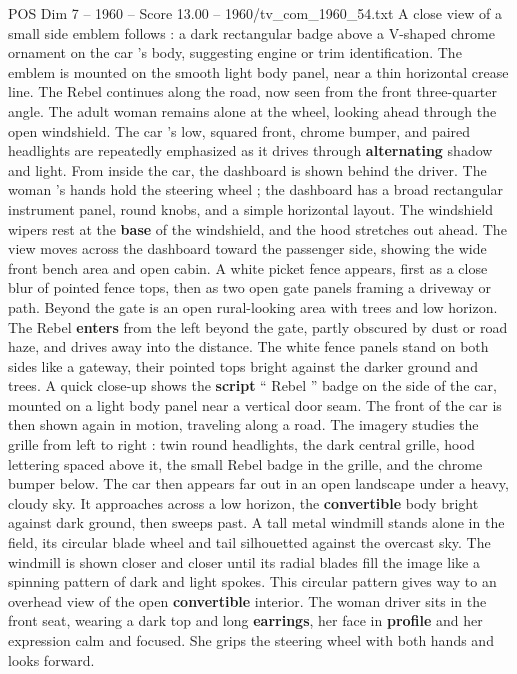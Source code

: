 \begin{textsample}{POS Dim 7 – 1960 – Score 13.00 – 1960/tv\_com\_1960\_54.txt}
A close view of a small side emblem follows : a dark rectangular badge above a V-shaped chrome ornament on the car ’s body, suggesting engine or trim identification.
The emblem is mounted on the smooth light body panel, near a thin horizontal crease line.
The Rebel continues along the road, now seen from the front three-quarter angle.
The adult woman remains alone at the wheel, looking ahead through the open windshield.
The car ’s low, squared front, chrome bumper, and paired headlights are repeatedly emphasized as it drives through \textbf{alternating} shadow and light.
From inside the car, the dashboard is shown behind the driver.
The woman ’s hands hold the steering wheel ; the dashboard has a broad rectangular instrument panel, round knobs, and a simple horizontal layout.
The windshield wipers rest at the \textbf{base} of the windshield, and the hood stretches out ahead.
The view moves across the dashboard toward the passenger side, showing the wide front bench area and open cabin.
A white picket fence appears, first as a close blur of pointed fence tops, then as two open gate panels framing a driveway or path.
Beyond the gate is an open rural-looking area with trees and low horizon.
The Rebel \textbf{enters} from the left beyond the gate, partly obscured by dust or road haze, and drives away into the distance.
The white fence panels stand on both sides like a gateway, their pointed tops bright against the darker ground and trees.
A quick close-up shows the \textbf{script} “ Rebel ” badge on the side of the car, mounted on a light body panel near a vertical door seam.
The front of the car is then shown again in motion, traveling along a road.
The imagery studies the grille from left to right : twin round headlights, the dark central grille, hood lettering spaced above it, the small Rebel badge in the grille, and the chrome bumper below.
The car then appears far out in an open landscape under a heavy, cloudy sky.
It approaches across a low horizon, the \textbf{convertible} body bright against dark ground, then sweeps past.
A tall metal windmill stands alone in the field, its circular blade wheel and tail silhouetted against the overcast sky.
The windmill is shown closer and closer until its radial blades fill the image like a spinning pattern of dark and light spokes.
This circular pattern gives way to an overhead view of the open \textbf{convertible} interior.
The woman driver sits in the front seat, wearing a dark top and long \textbf{earrings}, her face in \textbf{profile} and her expression calm and focused.
She grips the steering wheel with both hands and looks forward.

\end{textsample}
